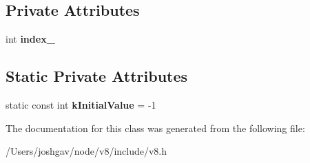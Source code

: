 \subsection*{Private Attributes}
\begin{DoxyCompactItemize}
\item 
int {\bfseries index\+\_\+}\hypertarget{classv8_1_1_eternal_ad186efc74d3640ebef961abc1f7430cf}{}\label{classv8_1_1_eternal_ad186efc74d3640ebef961abc1f7430cf}

\end{DoxyCompactItemize}
\subsection*{Static Private Attributes}
\begin{DoxyCompactItemize}
\item 
static const int {\bfseries k\+Initial\+Value} = -\/1\hypertarget{classv8_1_1_eternal_adfc0b4ef32d5926b58b0b216eb051298}{}\label{classv8_1_1_eternal_adfc0b4ef32d5926b58b0b216eb051298}

\end{DoxyCompactItemize}


The documentation for this class was generated from the following file\+:\begin{DoxyCompactItemize}
\item 
/\+Users/joshgav/node/v8/include/v8.\+h\end{DoxyCompactItemize}
